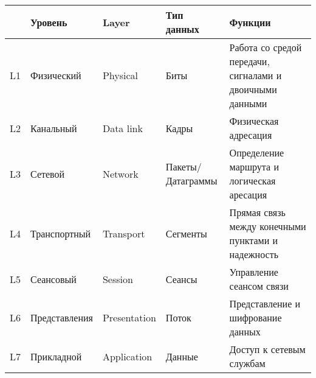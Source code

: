 \bigskip\noindent
\begin{tabular}{l l l l p{}}
& Уровень & Layer & Тип данных & Функции \\
\hline
L1 & Физический & Physical & Биты & Работа со средой передачи, сигналами и
двоичными данными \\
L2 & Канальный & Data link & Кадры & Физическая адресация \\
L3 & Сетевой & Network & Пакеты/Датаграммы & Определение маршрута и логическая
аресация \\
L4 & Транспортный & Transport & Сегменты & Прямая связь между конечными пунктами
и надежность \\
L5 & Сеансовый & Session & Сеансы & Управление сеансом связи \\
L6 & Представления & Presentation & Поток & Представление и шифрование данных \\
L7 & Прикладной & Application & Данные & Доступ к сетевым службам \\ 
\end{tabular}
